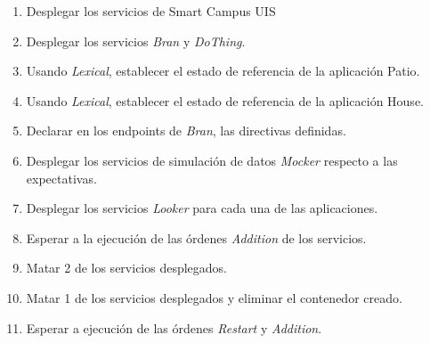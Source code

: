 \begin{enumerate}[itemsep=0mm]
    \item Desplegar los servicios de Smart Campus UIS
    \item Desplegar los servicios \textit{Bran} y \textit{DoThing}.
    \item Usando \textit{Lexical}, establecer el estado de referencia de la aplicación Patio. 
    \item Usando \textit{Lexical}, establecer el estado de referencia de la aplicación House. 
    \item Declarar en los endpoints de \textit{Bran}, las directivas definidas.
    \item Desplegar los servicios de simulación de datos \textit{Mocker} respecto a las expectativas.
    \item Desplegar los servicios \textit{Looker} para cada una de las aplicaciones.
    \item Esperar a la ejecución de las órdenes \textit{Addition} de los servicios.
    \item Matar 2 de los servicios desplegados.
    \item Matar 1 de los servicios desplegados y eliminar el contenedor creado.
    \item Esperar a ejecución de las órdenes \textit{Restart} y \textit{Addition}.
\end{enumerate}